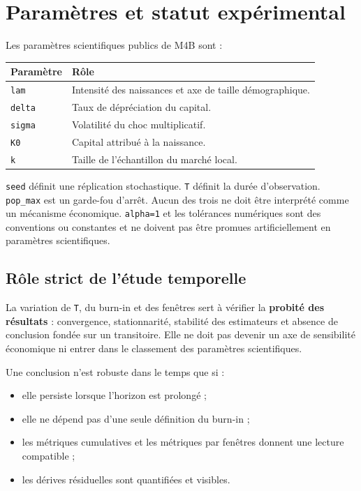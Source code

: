\documentclass[11pt,a4paper]{article}
\newcommand{\code}[1]{\texttt{\color{navy}#1}}
\newcommand{\term}[1]{\textbf{\color{navy}#1}}
\begin{document}
\section{Paramètres et statut expérimental}

Les paramètres scientifiques publics de M4B sont :

\begin{longtable}{@{}p{}p{}@{}}
\toprule
\textbf{Paramètre} & \textbf{Rôle} \\
\midrule
\endhead
\code{lam} & Intensité des naissances et axe de taille démographique. \\
\code{delta} & Taux de dépréciation du capital. \\
\code{sigma} & Volatilité du choc multiplicatif. \\
\code{K0} & Capital attribué à la naissance. \\
\code{k} & Taille de l'échantillon du marché local. \\
\bottomrule
\end{longtable}

\code{seed} définit une réplication stochastique. \code{T} définit la durée
d'observation. \code{pop\_max} est un garde-fou d'arrêt. Aucun des trois ne doit
être interprété comme un mécanisme économique. \code{alpha=1} et les
tolérances numériques sont des conventions ou constantes et ne doivent pas
être promues artificiellement en paramètres scientifiques.

\subsection{Rôle strict de l'étude temporelle}

La variation de \code{T}, du burn-in et des fenêtres sert à vérifier la
\term{probité des résultats} : convergence, stationnarité, stabilité des
estimateurs et absence de conclusion fondée sur un transitoire. Elle ne doit
pas devenir un axe de sensibilité économique ni entrer dans le classement des
paramètres scientifiques.

Une conclusion n'est robuste dans le temps que si :

\begin{itemize}
  \item elle persiste lorsque l'horizon est prolongé ;
  \item elle ne dépend pas d'une seule définition du burn-in ;
  \item les métriques cumulatives et les métriques par fenêtres donnent une
    lecture compatible ;
  \item les dérives résiduelles sont quantifiées et visibles.
\end{itemize}
\end{document}
